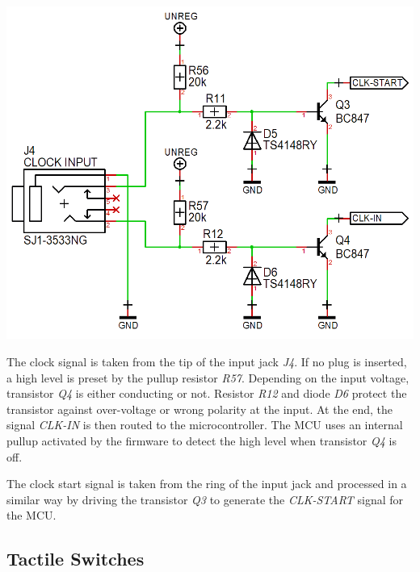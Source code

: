 \documentclass{scrartcl}
\begin{document}
\begin{center}
    \includegraphics[scale=0.40]{assets/schema-clocks.png}
\end{center}

The clock signal is taken from the tip of the input jack \emph{J4}. If no plug is inserted, a high level is preset by the pullup resistor \emph{R57}. Depending on the input voltage, transistor \emph{Q4} is either conducting or not. Resistor \emph{R12} and diode \emph{D6} protect the transistor against over-voltage or wrong polarity at the input. At the end, the signal \emph{CLK-IN} is then routed to the microcontroller. The MCU uses an internal pullup activated by the firmware to detect the high level when transistor \emph{Q4} is off.

The clock start signal is taken from the ring of the input jack and processed in a similar way by driving the transistor \emph{Q3} to generate the \emph{CLK-START} signal for the MCU.

\subsection{Tactile Switches}
\end{document}
